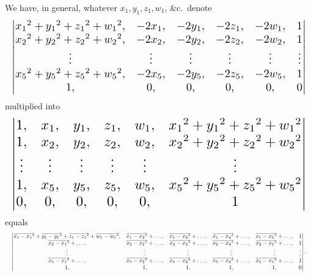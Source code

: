 \documentclass[11pt]{article}
\begin{document}
We have, in general, whatever $x_1, y_1, z_1, w_1$, \&c.\ denote
\[
\resizebox{\textwidth}{!}{$\displaystyle
\begin{vmatrix}
x_1{}^2 + y_1{}^2 + z_1{}^2 + w_1{}^2, & -2x_1, & -2y_1, & -2z_1, & -2w_1, & 1 \\
x_2{}^2 + y_2{}^2 + z_2{}^2 + w_2{}^2, & -2x_2, & -2y_2, & -2z_2, & -2w_2, & 1 \\
\vdots & \vdots & \vdots & \vdots & \vdots & \vdots \\
x_5{}^2 + y_5{}^2 + z_5{}^2 + w_5{}^2, & -2x_5, & -2y_5, & -2z_5, & -2w_5, & 1 \\
1, & 0, & 0, & 0, & 0, & 0
\end{vmatrix}
$}
\]
multiplied into
\[
\resizebox{\textwidth}{!}{$\displaystyle
\begin{vmatrix}
1, & x_1, & y_1, & z_1, & w_1, & x_1{}^2 + y_1{}^2 + z_1{}^2 + w_1{}^2 \\
1, & x_2, & y_2, & z_2, & w_2, & x_2{}^2 + y_2{}^2 + z_2{}^2 + w_2{}^2 \\
\vdots & \vdots & \vdots & \vdots & \vdots & \vdots \\
1, & x_5, & y_5, & z_5, & w_5, & x_5{}^2 + y_5{}^2 + z_5{}^2 + w_5{}^2 \\
0, & 0, & 0, & 0, & 0, & 1
\end{vmatrix}
$}
\]
equals
\[
\resizebox{\textwidth}{!}{$\displaystyle
\begin{vmatrix}
\overline{x_1-x_1}{}^2 + \overline{y_1-y_1}{}^2 + \overline{z_1-z_1}{}^2 + \overline{w_1-w_1}{}^2, & \overline{x_1-x_2}{}^2 + \dots, & \overline{x_1-x_3}{}^2 + \dots, & \overline{x_1-x_4}{}^2 + \dots, & \overline{x_1-x_5}{}^2 + \dots, & 1 \\
\overline{x_2-x_1}{}^2 + \dots, & \overline{x_2-x_2}{}^2 + \dots, & \overline{x_2-x_3}{}^2 + \dots, & \overline{x_2-x_4}{}^2 + \dots, & \overline{x_2-x_5}{}^2 + \dots, & 1 \\
\vdots & \vdots & \vdots & \vdots & \vdots & \vdots \\
\overline{x_5-x_1}{}^2 + \dots, & \overline{x_5-x_2}{}^2 + \dots, & \overline{x_5-x_3}{}^2 + \dots, & \overline{x_5-x_4}{}^2 + \dots, & \overline{x_5-x_5}{}^2 + \dots, & 1 \\
1, & 1, & 1, & 1, & 1, & 0
\end{vmatrix}.
$}
\]
\end{document}
